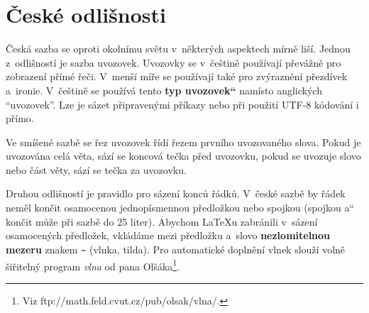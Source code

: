 \documentclass[a4paper,11pt, twocolumn]{article}
\newcommand\quot[1]{\quotedblbase #1\textquotedblleft}
\begin{document}
\section{České odlišnosti}
{Česká sazba se oproti okolnímu světu v~některých aspektech mírně liší. Jednou z~odlišností je sazba uvozovek. Uvozovky se v~češtině používají převážně pro zobrazení přímé řeči. V~menší míře se používají také pro zvýraznění přezdívek a~ironie. V~češtině se používá tento \textbf{\quot{typ uvozovek}} namísto anglických ``uvozovek''. Lze je sázet připravenými příkazy nebo při použití UTF-8 kódování i přímo.\par
Ve smíšené sazbě se řez uvozovek řídí řezem prvního uvozovaného slova. Pokud je uvozována celá věta, sází se koncová tečka před uvozovku, pokud se uvozuje slovo nebo část věty, sází se tečka za uvozovku.\par
Druhou odlišností je pravidlo pro sázení konců řádků. V~české sazbě by řádek neměl končit osamocenou jednopísmennou předložkou nebo spojkou (spojkou \quot{a} končit může při sazbě do 25 liter). Abychom \LaTeX u zabránili v~sázení osamocených předložek, vkládáme mezi předložku a~slovo \textbf{nezlomitelnou mezeru} znakem \verb$~$ (vlnka, tilda). Pro automatické doplnění vlnek slouží volně šiřitelný program \emph{vlna} od pana Olšáka\footnote  {Viz ftp://math.feld.cvut.cz/pub/olsak/vlna/.}.}
\end{document}
